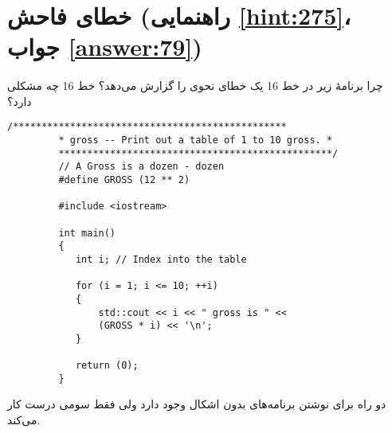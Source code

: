 \section[خطای فاحش]{خطای فاحش \protect{} (راهنمایی \ref{hint:275}، جواب \ref{answer:79})}
\paragraph{}\label{prog:74}
چرا برنامهٔ زیر در خط 16 یک خطای نحوی را گزارش می‌دهد؟ خط 16 چه مشکلی دارد؟

\begin{LTR}
    \begin{lstlisting}[style=C++Style]
         /************************************************
         * gross -- Print out a table of 1 to 10 gross. *
         ************************************************/
         // A Gross is a dozen - dozen
         #define GROSS (12 ** 2)

         #include <iostream>

         int main()
         {
         	int i; // Index into the table

         	for (i = 1; i <= 10; ++i)
         	{
         		std::cout << i << " gross is " <<
         		(GROSS * i) << '\n';
         	}

         	return (0);
         }
    \end{lstlisting}
\end{LTR}

\begin{tcolorbox}
    دو راه برای نوشتن برنامه‌های بدون اشکال وجود دارد ولی فقط سومی درست کار می‌کند.
\end{tcolorbox}